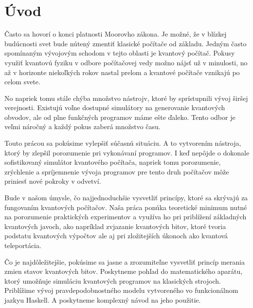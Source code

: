 

\chapter*{Úvod}

Často sa hovorí o konci platnosti Moorovho zákona. Je možné, že v blízkej
budúcnosti svet bude nútený zmentiť klasické počítače od základu. Jedným 
často spomínaným vývojovým schodom v tejto oblasti je kvantový počítač.
Pokusy využiť kvantovú fyziku v odbore počítačovej vedy možno nájsť už v
minulosti, no až v horizonte niekoľkých rokov nastal prelom a kvantové
počítače vznikajú po celom svete.

No napriek tomu stále chýba množstvo nástrojv, ktoré by sprístupnili vývoj
širšej verejnosti. Existujú voľne dostupné simulátory na generovanie kvantových
obvodov, ale od plne funkčných programov máme ešte ďaleko. Tento odbor je 
veľmi náročný a každý pokus zaberá množstvo času. 

Touto prácou sa pokúsime vylepšiť súčasnú situáciu. A to vytvorením nástroja,
ktorý by zlepšil porozumenie pri vykonávaní programov. I keď nepôjde o 
dokonale sofistikovaný simulátor kvantového počítača, napriek tomu porozumenie,
zrýchlenie a spríjemnenie vývoja programov pre tento druh počítačov môže 
priniesť nové pokroky v odvetví.

Bude v našom úmysle, čo najjednoduchšie vysvetliť princípy, ktoré sa skrývajú
za fungovaním kvantových počítačov. Naša práca ponúka teoretické minimum
nutné na porozumenie praktických experimentov a využíva ho pri priblížení
základných kvantových javoch, ako napríklad zvjazanie kvantových bitov, ktoré 
tvoria podstatu kvantových výpočtov ale aj pri zložitejších úkonoch ako 
kvantová teleportácia.


Čo je najdôležitejšie, pokúsime sa jasne a zrozumiteľne vysvetliť princíp
merania zmien stavov kvantových bitov. Poskytneme pohľad do matematického
aparátu, ktorý umožňuje simuláciu kvantových programov na klasických strojoch.
Priblížime vývoj pravdepodobnostného modelu vytvoreného vo funkcionálnom jazkyu
Haskell. A poskytneme komplexný návod na jeho použitie.

